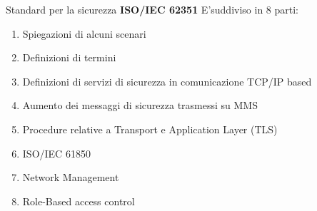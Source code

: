 \begin{frame}{Standard per la sicurezza}
	\textbf{ISO/IEC 62351}
	\newline
	E'suddiviso in 8 parti:
	\begin{enumerate}[<+- | alert@+>]
		\item Spiegazioni di alcuni scenari
		\item Definizioni di termini
		\item Definizioni di servizi di sicurezza in comunicazione TCP/IP based
		\item Aumento dei messaggi di sicurezza trasmessi su MMS
		\item Procedure relative a Transport e Application Layer (TLS)%
		\item ISO/IEC 61850 %
		\item Network Management
		\item Role-Based access control
	\end{enumerate}
\end{frame}